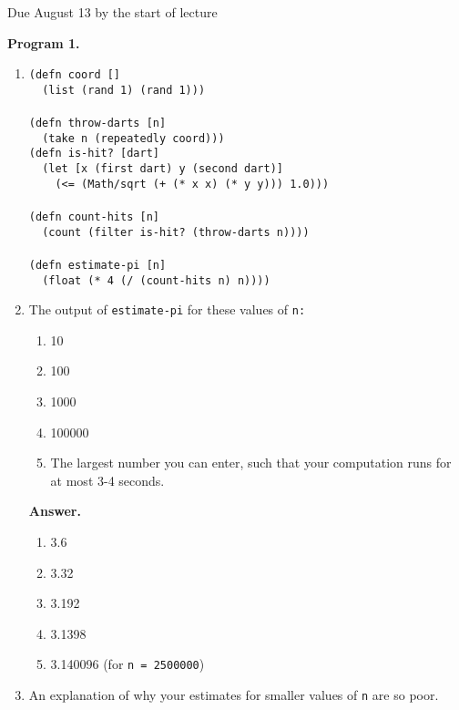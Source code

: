\documentclass[9pt]{article}
\begin{document}
\noindent Due August 13 by the start of lecture

\textbf{Program 1.}
\begin{enumerate}
   \item \verb|(defn coord []| \\
         \verb|  (list (rand 1) (rand 1)))| \\ \\
  
         \verb|(defn throw-darts [n]| \\
         \verb|  (take n (repeatedly coord)))| \\
  
         \verb|(defn is-hit? [dart]| \\
         \verb|  (let [x (first dart) y (second dart)]| \\
         \verb|    (<= (Math/sqrt (+ (* x x) (* y y))) 1.0)))| \\ \\
    
         \verb|(defn count-hits [n]| \\
         \verb|  (count (filter is-hit? (throw-darts n))))| \\ \\
  
         \verb|(defn estimate-pi [n]| \\
         \verb|  (float (* 4 (/ (count-hits n) n))))|
   \item The output of \verb|estimate-pi| for these values of \verb|n:|

         \begin{enumerate}
            \item 10
            \item 100
            \item 1000
            \item 100000
            \item The largest number you can enter, such that your computation
                  runs for at most 3-4 seconds.
         \end{enumerate}
         
      \textbf{Answer.}
      
      \begin{enumerate}      
         \item 3.6
         \item 3.32
         \item 3.192
         \item 3.1398
         \item 3.140096 (for \verb|n = 2500000|)
      \end{enumerate}
   \item An explanation of why your estimates for smaller values of \verb|n| are
         so poor.


\end{enumerate}
\end{document}
